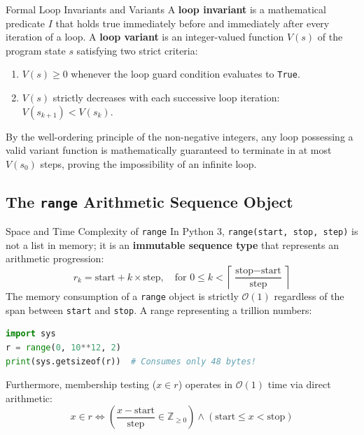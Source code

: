 \begin{definitionbox}{Formal Loop Invariants and Variants}
 
A \textbf{loop invariant} is a mathematical predicate $I$ that holds true immediately before and immediately after every iteration of a loop.
A \textbf{loop variant} is an integer-valued function $V(s)$ of the program state $s$ satisfying two strict criteria:
\begin{enumerate}
    \item $V(s) \ge 0$ whenever the loop guard condition evaluates to \texttt{True}.
    \item $V(s)$ strictly decreases with each successive loop iteration: $V(s_{k+1}) < V(s_k)$.
\end{enumerate}
By the well-ordering principle of the non-negative integers, any loop possessing a valid variant function is mathematically guaranteed to terminate in at most $V(s_0)$ steps, proving the impossibility of an infinite loop.
\end{definitionbox}

\subsection{The \texttt{range} Arithmetic Sequence Object}

\begin{theorembox}{Space and Time Complexity of \texttt{range}}
In Python 3, \texttt{range(start, stop, step)} is not a list in memory; it is an \textbf{immutable sequence type} that represents an arithmetic progression:
\begin{equation}
r_k = \text{start} + k \times \text{step}, \quad \text{for } 0 \le k < \left\lceil \frac{\text{stop} - \text{start}}{\text{step}} \right\rceil
\end{equation}
The memory consumption of a \texttt{range} object is strictly $\mathcal{O}(1)$ regardless of the span between \texttt{start} and \texttt{stop}. A range representing a trillion numbers:
\begin{lstlisting}[language=Python]
import sys
r = range(0, 10**12, 2)
print(sys.getsizeof(r))  # Consumes only 48 bytes!
\end{lstlisting}
Furthermore, membership testing ($x \in r$) operates in $\mathcal{O}(1)$ time via direct arithmetic:
\begin{equation}
x \in r \iff \left( \frac{x - \text{start}}{\text{step}} \in \mathbb{Z}_{\ge 0} \right) \land (\text{start} \le x < \text{stop})
\end{equation}
\end{theorembox}

